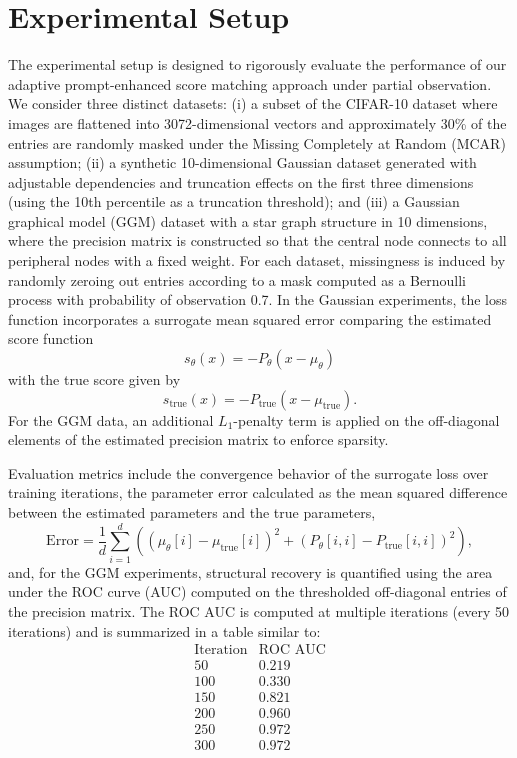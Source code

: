 \documentclass{article} %
\begin{document}
\section{Experimental Setup}
The experimental setup is designed to rigorously evaluate the performance of our adaptive prompt-enhanced score matching approach under partial observation. We consider three distinct datasets: (i) a subset of the CIFAR-10 dataset where images are flattened into 3072-dimensional vectors and approximately 30\% of the entries are randomly masked under the Missing Completely at Random (MCAR) assumption; (ii) a synthetic 10-dimensional Gaussian dataset generated with adjustable dependencies and truncation effects on the first three dimensions (using the 10th percentile as a truncation threshold); and (iii) a Gaussian graphical model (GGM) dataset with a star graph structure in 10 dimensions, where the precision matrix is constructed so that the central node connects to all peripheral nodes with a fixed weight. For each dataset, missingness is induced by randomly zeroing out entries according to a mask computed as a Bernoulli process with probability of observation 0.7. In the Gaussian experiments, the loss function incorporates a surrogate mean squared error comparing the estimated score function 
\[
s_\theta(x) = -P_\theta (x - \mu_\theta)
\]
with the true score given by 
\[
s_{\mathrm{true}}(x) = -P_{\mathrm{true}} (x-\mu_{\mathrm{true}}).
\]
For the GGM data, an additional \(L_1\)-penalty term is applied on the off-diagonal elements of the estimated precision matrix to enforce sparsity.

Evaluation metrics include the convergence behavior of the surrogate loss over training iterations, the parameter error calculated as the mean squared difference between the estimated parameters and the true parameters,
\[
\text{Error} = \frac{1}{d} \sum_{i=1}^{d} \left( (\mu_\theta[i]-\mu_{\mathrm{true}}[i])^2 + (P_\theta[i,i]-P_{\mathrm{true}}[i,i])^2 \right),
\]
and, for the GGM experiments, structural recovery is quantified using the area under the ROC curve (AUC) computed on the thresholded off-diagonal entries of the precision matrix. The ROC AUC is computed at multiple iterations (every 50 iterations) and is summarized in a table similar to:
\[
\begin{array}{c|c}
\text{Iteration} & \text{ROC AUC} \\
\hline
50 & 0.219 \\
100 & 0.330 \\
150 & 0.821 \\
200 & 0.960 \\
250 & 0.972 \\
300 & 0.972 \\
\end{array}
\]
\end{document}
